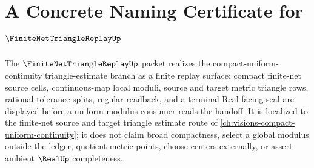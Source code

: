 \chapter{A Concrete Naming Certificate for $\FiniteNetTriangleReplayUp$}
\label{ch:concrete-instances-finite-net-triangle-replay-namecert}

The $\FiniteNetTriangleReplayUp$ packet realizes the compact-uniform-continuity triangle-estimate branch as a finite replay surface: compact finite-net source cells, continuous-map local moduli, source and target metric triangle rows, rational tolerance splits, regular readback, and a terminal Real-facing seal are displayed before a uniform-modulus consumer reads the handoff. It is localized to the finite-net source and target triangle estimate route of \autoref{ch:visions-compact-uniform-continuity}; it does not claim broad compactness, select a global modulus outside the ledger, quotient metric points, choose centers externally, or assert ambient $\RealUp$ completeness.

